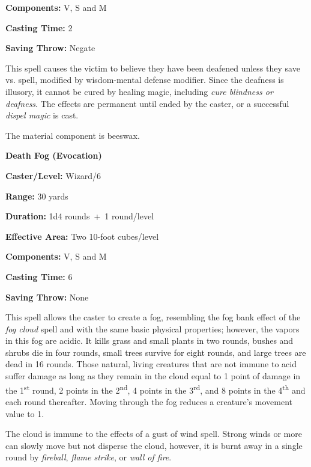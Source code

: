 \begin{multicols}{2}
\begin{minipage}{\columnwidth}
\noindent \textbf{Components:} V, S and M

\noindent \textbf{Casting Time:} 2

\noindent \textbf{Saving Throw:} Negate

\end{minipage}

This spell causes the victim to believe they have been deafened unless they save vs. spell, modified by wisdom-mental defense modifier.  Since the deafness is illusory, it cannot be cured by healing magic, including \textit{cure blindness or deafness}.  The effects are permanent until ended by the caster, or a successful \textit{dispel magic} is cast.

The material component is beeswax.

\vspace{1em}

\noindent
\begin{minipage}{\columnwidth}

\noindent \textbf{Death Fog (Evocation)}

\noindent \textbf{Caster/Level:} Wizard/6

\noindent \textbf{Range:} 30 yards

\noindent \textbf{Duration:} 1d4 rounds~+~1 round/level

\noindent \textbf{Effective Area:} Two 10-foot cubes/level

\noindent \textbf{Components:} V, S and M

\noindent \textbf{Casting Time:} 6

\noindent \textbf{Saving Throw:} None

\end{minipage}

This spell allows the caster to create a fog, resembling the fog bank effect of the \textit{fog cloud} spell and with the same basic physical properties; however, the vapors in this fog are acidic.  It kills grass and small plants in two rounds, bushes and shrubs die in four rounds, small trees survive for eight rounds, and large trees are dead in 16 rounds.  Those natural, living creatures that are not immune to acid suffer damage as long as they remain in the cloud equal to 1 point of damage in the 1\textsuperscript{st} round, 2 points in the 2\textsuperscript{nd}, 4 points in the 3\textsuperscript{rd}, and 8 points in the 4\textsuperscript{th} and each round thereafter.  Moving through the fog reduces a creature's movement value to 1.

The cloud is immune to the effects of a gust of wind spell.  Strong winds or more can slowly move but not disperse the cloud, however, it is burnt away in a single round by \textit{fireball}, \textit{flame strike}, or \textit{wall of fire}.  


\end{multicols}
